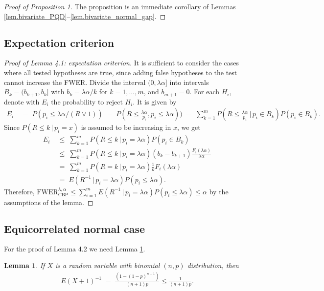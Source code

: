 \documentclass {imsart}
\newtheorem{lemma}{Lemma}
\newcommand{\FWERcb}{\mathrm{FWER}_{\mathrm{CBP}}^{\lambda,\alpha}}
\begin{document}
\begin{proof}[Proof of Proposition 1]
The proposition is an immediate corollary of Lemmas \ref{lem.bivariate_PQD}--\ref{lem.bivariate_normal_gap}.
\end{proof}


\subsection{Expectation criterion}
\begin{proof}[Proof of Lemma 4.1: expectation criterion]
It is sufficient to consider the cases where all tested hypotheses are true, since adding false hypotheses to the test cannot increase the FWER. Divide the interval $(0, \lambda \alpha]$ into intervals $B_k = (b_{k+1}, b_k]$ with $b_k = \lambda \alpha / k$ for $k=1,\ldots,m$, and $b_{m+1}=0$. For each $H_i$, denote with $E_i$ the probability to reject $H_i$. It is given by
\begin{align*}
E_i&\;=\;P(p_i \le \lambda \alpha / (R \lor 1))
\;=\;P(R \le \tfrac{\lambda \alpha}{p_i}, p_i \le \lambda \alpha))
\;=\;\sum_{k=1}^{m}{P(R \le \tfrac{\lambda \alpha}{p_i}\,|\,p_i \in B_k)P(p_i \in B_k)}.
\end{align*}
Since $P(R\le{}k\,|\,p_i=x)$ is assumed to be increasing in $x$, we get
\begin{align*}
E_i&\;\leq\;\sum_{k=1}^{m}{P(R \le k\,|\,p_i =\lambda \alpha)P(p_i \in B_k)}\\
&\;\leq\;\sum_{k=1}^{m}{P(R \le k\,|\,p_i =\lambda \alpha)(b_k-b_{k+1})\frac{F_i(\lambda \alpha)}{\lambda \alpha}}\\
&\;=\;\sum_{k=1}^{m}{P(R = k\,|\,p_i =\lambda \alpha)\frac{1}{k} F_i(\lambda \alpha)}\\
&\;=\;E(R^{-1}\,|\,p_i =\lambda \alpha)P(p_i \le \lambda \alpha).
\end{align*}
Therefore, $\FWERcb\le\sum_{i=1}^{m}{E(R^{-1}\,|\,p_i=\lambda\alpha)P(p_i\le\lambda\alpha)}\leq\alpha$ by the assumptions of the lemma.
\end{proof}

\subsection{Equicorrelated normal case}

For the proof of Lemma 4.2 we need Lemma \ref{lem:binomial}.
\begin{lemma}
\label{lem:binomial}
If $X$ is a random variable with binomial $(n, p)$ distribution, then
\begin{align*}
E(X+1)^{-1}\;=\;\frac{(1-(1-p)^{n+1})}{(n+1)p} \le \frac{1}{(n+1)p}.
\end{align*}
\end{lemma}
\end{document}
